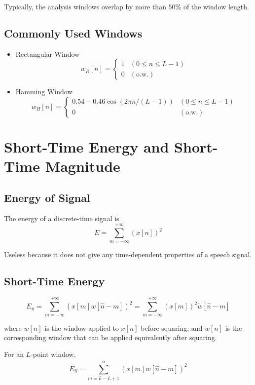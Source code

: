 Typically, the analysis windows overlap by more than $50\%$ of the window length.

\subsection{Commonly Used Windows}
\begin{itemize}
    \item Rectangular Window
    \[ w_R[n] = 
    \begin{cases}
        1 &(0 \le n \le L-1)\\
        0 &(\text{o.w.})
    \end{cases}
    \]
    \item Hamming Window
    \[ w_H[n] = 
    \begin{cases}
        0.54-0.46\cos(2\pi n/(L-1)) &(0 \le n \le L-1)\\
        0 &(\text{o.w.})
    \end{cases}
    \]
\end{itemize}

\section{Short-Time Energy and Short-Time Magnitude}
\subsection{Energy of Signal}
\begin{definition}[Energy]
    The energy of a discrete-time signal is
    \[ E = \sum_{m=-\infty}^{+\infty}(x[n])^2 \]
\end{definition}
Useless because it does not give any time-dependent properties of a speech signal.

\subsection{Short-Time Energy}
\begin{definition}
    \[ E_{\hat{n}} = \sum_{m=-\infty}^{+\infty} (x[m]w[\hat{n}-m])^2 = \sum_{m=-\infty}^{+\infty} (x[m])^2\tilde{w}[\hat{n}-m]\]
\end{definition}
where $w[n]$ is the window applied to $x[n]$ before squaring, and $\tilde{w}[n]$ is the corresponding window that can be applied equivalently after squaring.

For an $L$-point window,
\[ E_{\hat{n}} = \sum_{m=\hat{n}-L+1}^{\hat{n}} (x[m]w[\hat{n}-m])^2 \]

